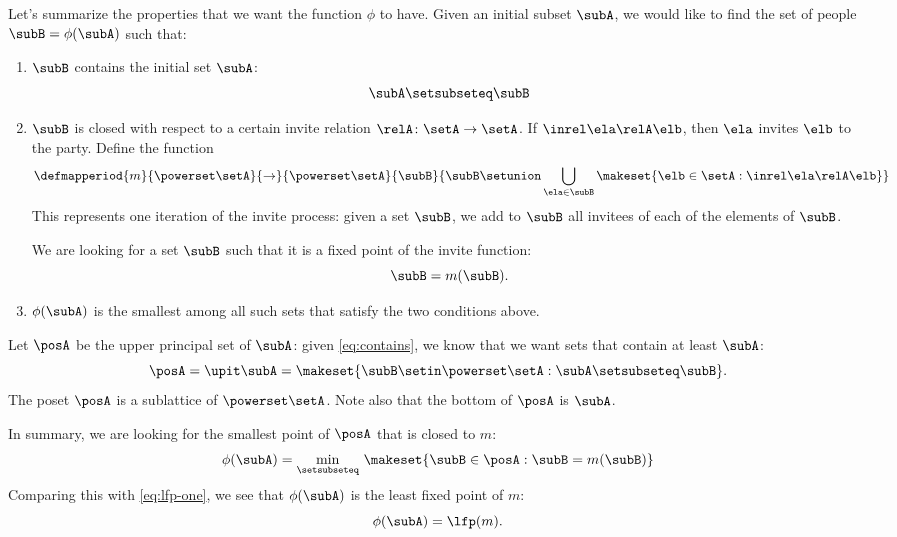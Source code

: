 Let's summarize the properties that we want the function $\phi$ to have.
Given an initial subset $\subA$, we would like to find the set of people $\subB = \phi(\subA)$ such that:
\begin{enumerate}
    \item $\subB$ contains the initial set $\subA$:
          \begin{equation}\label{eq:contains}
              \subA \setsubseteq \subB
          \end{equation}
    \item $\subB$ is closed with respect to a certain invite relation $\relA \colon \setA \to \setA$.
          If $\inrel \ela \relA \elb$, then $\ela$ invites $\elb$ to the party.
          Define the function
          \begin{equation}
              \defmapperiod{m}{\powerset \setA}{\to}{\powerset \setA
              }{
                  \subB
              }{
                  \subB \setunion \bigcup_{\ela \in \subB} \makeset{ \elb \in \setA : \inrel \ela \relA \elb}
              }
          \end{equation}
          This represents one iteration of the invite process: given a set $\subB$, we add to $\subB$ all invitees of each of the elements of $\subB$.

          We are looking for a set $\subB$ such that it is a fixed point of the invite function:
          \begin{equation}
              \subB = m(\subB).
          \end{equation}

    \item $\phi(\subA)$ is the smallest among all such sets that satisfy the two conditions above.
\end{enumerate}

Let $\posA$ be the upper principal set of $\subA$: given \cref{eq:contains}, we know that we want sets that contain at least $\subA$:
\begin{equation}
    \posA = \upit \subA  = \makeset{ \subB \setin \powerset \setA : \subA \setsubseteq \subB }.
\end{equation}
The poset $\posA$ is a sublattice of $\powerset \setA$.
Note also that the bottom of $\posA$ is $\subA$.

In summary, we are looking for the smallest point of $\posA$ that is closed to $m$:
%
\begin{equation}
    \phi(\subA) = \min_{\setsubseteq}\, \makeset{ \subB \in \posA : \subB = m(\subB) }
\end{equation}
Comparing this with \cref{eq:lfp-one}, we see that $ \phi(\subA)$ is the least fixed point of $m$:
\begin{equation}
    \phi(\subA) = \lfp(m).
\end{equation}

